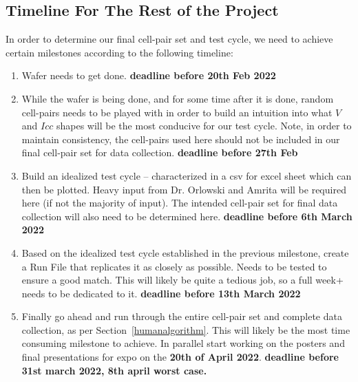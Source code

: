 \documentclass{article}
\begin{document}
      \subsection{Timeline For The Rest of the Project}

        In order to determine our final cell-pair set and test cycle, we need to achieve certain milestones according to
        the following timeline:
        
        \begin{enumerate}
          \item Wafer needs to get done. \textbf{deadline before 20th Feb 2022}
          \item While the wafer is being done, and for some time after it is done, random cell-pairs needs to be played
            with in order to build an intuition into what $V$ and $Icc$ shapes will be the most conducive for our test
            cycle. Note, in order to maintain consistency, the cell-pairs used here should not be included in our final
            cell-pair set for data collection. \textbf{deadline before 27th Feb}
          \item Build an idealized test cycle -- characterized in a csv for excel sheet which can then be plotted. Heavy
            input from Dr. Orlowski and Amrita will be required here (if not the majority of input). The intended
            cell-pair set for final data collection will also need to be determined here. \textbf{deadline before 6th
            March 2022}
          \item Based on the idealized test cycle established in the previous milestone, create a Run File that
          replicates it as closely as possible. Needs to be tested to ensure a good match. This will likely be quite a
          tedious job, so a full week+ needs to be dedicated to it. \textbf{deadline before 13th March 2022}
          \item Finally go ahead and run through the entire cell-pair set and complete data collection, as per
            Section~\ref{humanalgorithm}. This will likely be the most time consuming milestone to achieve. In parallel
            start working on the posters and final presentations for expo on the \textbf{20th of April 2022}.
            \textbf{deadline before 31st march 2022, 8th april worst case.}
        \end{enumerate}
        
  
\end{document}

